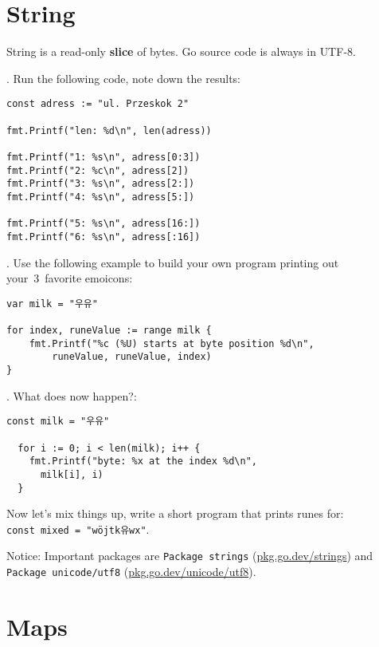 \documentclass[11pt, letterpaper]{article}
\begin{document}
\section{String}

String is a read-only \textbf{slice} of bytes. Go source code is always in {\small UTF}-8.

. Run the following code, note down the results:

\begin{verbatim}
const adress := "ul. Przeskok 2"

fmt.Printf("len: %d\n", len(adress))

fmt.Printf("1: %s\n", adress[0:3])
fmt.Printf("2: %c\n", adress[2])
fmt.Printf("3: %s\n", adress[2:])
fmt.Printf("4: %s\n", adress[5:])

fmt.Printf("5: %s\n", adress[16:])
fmt.Printf("6: %s\n", adress[:16])
\end{verbatim}


. Use the following example to build your own program printing out your~3~favorite emoicons:

\begin{verbatim}
var milk = "우유"

for index, runeValue := range milk {
	fmt.Printf("%c (%U) starts at byte position %d\n",
		runeValue, runeValue, index)
}
\end{verbatim}

. What does now happen?:

\begin{verbatim}
const milk = "우유"

  for i := 0; i < len(milk); i++ {
    fmt.Printf("byte: %x at the index %d\n",
      milk[i], i)
  }
\end{verbatim}

Now let's mix things up, write a short program that prints runes for:\\ \texttt{const mixed = "wöjtk유wx"}.

\bigskip
Notice: Important packages are \verb|Package strings| (\href{https://pkg.go.dev/strings}{pkg.go.dev/strings}) and \verb|Package unicode/utf8| (\href{https://pkg.go.dev/unicode/utf8}{pkg.go.dev/unicode/utf8}).

\section{Maps}
\end{document}
